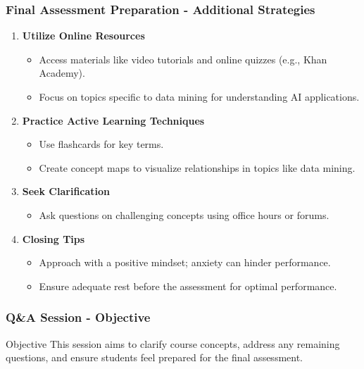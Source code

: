 \documentclass[aspectratio=169]{beamer}
\begin{document}
\begin{frame}[fragile]
    \frametitle{Final Assessment Preparation - Additional Strategies}
    \begin{enumerate}[resume]
        \item \textbf{Utilize Online Resources}
            \begin{itemize}
                \item Access materials like video tutorials and online quizzes (e.g., Khan Academy).
                \item Focus on topics specific to data mining for understanding AI applications.
            \end{itemize}
        \item \textbf{Practice Active Learning Techniques}
            \begin{itemize}
                \item Use flashcards for key terms.
                \item Create concept maps to visualize relationships in topics like data mining.
            \end{itemize}
        \item \textbf{Seek Clarification}
            \begin{itemize}
                \item Ask questions on challenging concepts using office hours or forums.
            \end{itemize}
        \item \textbf{Closing Tips}
            \begin{itemize}
                \item Approach with a positive mindset; anxiety can hinder performance.
                \item Ensure adequate rest before the assessment for optimal performance.
            \end{itemize}
    \end{enumerate}
\end{frame}

\begin{frame}[fragile]
    \frametitle{Q\&A Session - Objective}
    \begin{block}{Objective}
        This session aims to clarify course concepts, address any remaining questions, and ensure students feel prepared for the final assessment.
    \end{block}
\end{frame}
\end{document}
